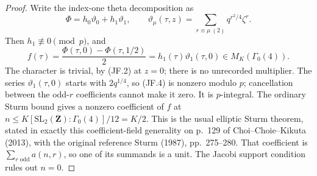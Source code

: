 \begin{proof}
Write the index-one theta decomposition as
\[
 \Phi=h_0\vartheta_0+h_1\vartheta_1,\qquad
 \vartheta_\mu(\tau,z)=
       \sum_{r\equiv\mu\ (2)}q^{r^2/4}\zeta^r.
\]
Then $h_1\not\equiv0\pmod p$, and
\[
 f(\tau)=\frac{\Phi(\tau,0)-\Phi(\tau,1/2)}2
        =h_1(\tau)\vartheta_1(\tau,0)
        \in M_K(\Gamma_0(4)).                           \tag{JF.4}
\]
The character is trivial, by (JF.2) at $z=0$; there is no unrecorded
multiplier.  The series $\vartheta_1(\tau,0)$ starts with $2q^{1/4}$,
so (JF.4) is nonzero modulo $p$; cancellation between the odd-$r$
coefficients cannot make it zero.  It is $p$-integral.
The ordinary Sturm bound gives a nonzero coefficient of $f$ at
$n\leq K[\mathrm{SL}_2(\mathbf Z):\Gamma_0(4)]/12=K/2$.
This is the usual elliptic Sturm theorem, stated in exactly this
coefficient-field generality on p.~129 of Choi--Choie--Kikuta (2013),
with the original reference Sturm (1987), pp.~275--280.
That coefficient is $\sum_{r\text{ odd}}a(n,r)$, so one of its
summands is a unit.  The Jacobi support condition rules out $n=0$.
\end{proof}

